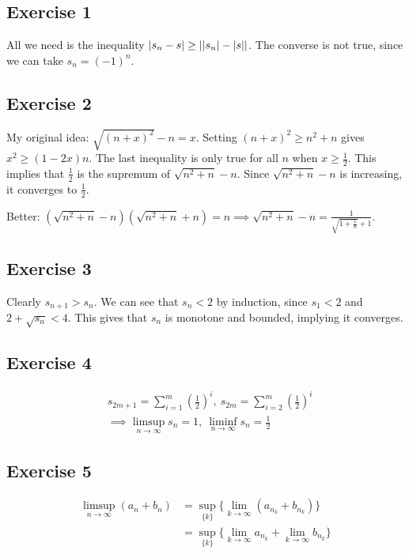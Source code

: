 \newpage

\subsection{Exercise 1}
All we need is the inequality $\abs{s_n - s} \geq \abs{\abs{s_n} - \abs{s}}$.
The converse is not true, since we can take $s_n = (-1)^n$.

\subsection{Exercise 2}
My original idea: $\sqrt{(n + x)^2} - n = x$. Setting $(n + x)^2 \geq n^2 + n$ gives
$x^2 \geq (1 - 2x) n$. The last inequality is only true for all $n$ when $x \geq \frac{1}{2}$.
This implies that $\frac{1}{2}$ is the supremum of $\sqrt{n^2 + n} - n$. Since 
$\sqrt{n^2 + n} - n$ is increasing, it converges to $\frac{1}{2}$.

Better: $(\sqrt{n^2 + n} - n) (\sqrt{n^2 + n} + n) = n \implies \sqrt{n^2 + n} - n = \frac{1}{\sqrt{1 + \frac{1}{n}} + 1}$.

\subsection{Exercise 3}
Clearly $s_{n + 1} > s_n$. We can see that $s_n < 2$ by induction, since $s_1 < 2$ and
$2 + \sqrt{s_n} < 4$. This gives that $s_n$ is monotone and bounded, implying it converges.

\subsection{Exercise 4}
\begin{align*}
&s_{2m + 1} = \sum_{i = 1}^{m} (\frac{1}{2})^i, \: s_{2m} = \sum_{i = 2}^{m} (\frac{1}{2})^i \\
&\implies \limsup_{n \to \infty} s_n = 1, \: \liminf_{n \to \infty} s_n = \frac{1}{2}
\end{align*}

\subsection{Exercise 5}
\begin{align*}
        \limsup_{n \to \infty} (a_n + b_n) &= \sup_{\{k\}}{\{\lim_{k \to \infty} (a_{n_k} + b_{n_k})\}} \\
                                           &= \sup_{\{k\}}{\{\lim_{k \to \infty} a_{n_k} + \lim_{k \to \infty} b_{n_k}\}}
\end{align*}

